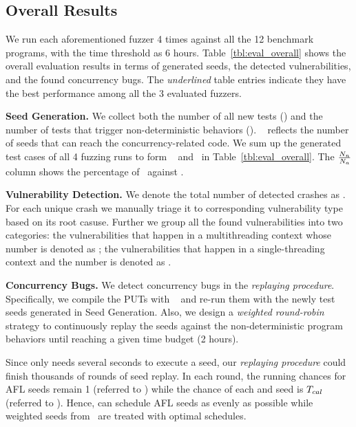 \subsection{Overall Results}\label{sec:eval_overall}

We run each aforementioned fuzzer 4 times against all the 12 benchmark programs, with the 
time threshold as 6 hours. Table~\ref{tbl:eval_overall} shows the overall evaluation results 
in terms of generated seeds, the detected vulnerabilities, and the found concurrency bugs. 
The \emph{underlined} table entries indicate they have the best performance among all the 3 
evaluated fuzzers. 

\textbf{Seed Generation.} 
We collect both the number of all new tests (\testsALL) and the number of tests that trigger 
non-deterministic behaviors (\testsMT). \testsMT~ reflects the number of seeds that can reach 
the concurrency-related code. We sum up the generated test cases of all 4 fuzzing runs to form 
\testsALL~ and \testsMT~in Table~\ref{tbl:eval_overall}. The $\frac{N_n}{N_a}$ column 
shows the percentage of \testsMT~against \testsALL.
    
\textbf{Vulnerability Detection.} 
We denote the total number of detected crashes as \vulsNUM. For each unique crash we manually 
triage it to corresponding vulnerability type based on its root casuse. Further we group all 
the found vulnerabilities into two categories: the vulnerabilities that happen in a multithreading 
context whose number is denoted as \vulsMT; the vulnerabilities that happen in a single-threading 
context and the number is denoted as \vulsST.




\textbf{Concurrency Bugs.} 
We detect concurrency bugs in the \emph{replaying procedure}. Specifically, we compile the PUTs 
with \ts~\cite{lwn_tsan} and re-run them with the newly test seeds generated in {Seed Generation}. 			 
Also, we design a \emph{weighted round-robin} strategy to continuously replay the seeds against 
the non-deterministic program behaviors until reaching a given time budget (2 hours). 

Since \ts only needs several seconds to execute a seed, our \emph{replaying procedure} could 
finish thousands of rounds of seed replay. In each round, the running chances for AFL seeds remain 
1 (referred to ) while the chance of each \mtfuzz and \mtfuzzc seed is $T_{cal}$ 
(referred to ). Hence, \ts can schedule AFL seeds as evenly as possible while weighted 
seeds from \mtfuzz~are treated with optimal schedules. 

